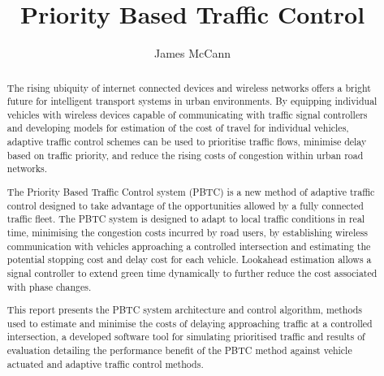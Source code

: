 \documentclass[11pt, a4paper, twoside, openright]{report}
\title{Priority Based Traffic Control}
\author{James McCann}
\date{}
\begin{document}
\frontmatter

\begin{abstract}

The rising ubiquity of internet connected devices and wireless networks offers a bright future for intelligent transport systems in urban environments. By equipping individual vehicles with wireless devices capable of communicating with traffic signal controllers and developing models for estimation of the cost of travel for individual vehicles, adaptive traffic control schemes can be used to prioritise traffic flows, minimise delay based on traffic priority, and reduce the rising costs of congestion within urban road networks.

The Priority Based Traffic Control system (PBTC) is a new method of adaptive traffic control designed to take advantage of the opportunities allowed by a fully connected traffic fleet. The PBTC system is designed to adapt to local traffic conditions in real time, minimising the congestion costs incurred by road users, by establishing wireless communication with vehicles approaching a controlled intersection and estimating the potential stopping cost and delay cost for each vehicle. Lookahead estimation allows a signal controller to extend green time dynamically to further reduce the cost associated with phase changes. 

This report presents the PBTC system architecture and control algorithm, methods used to estimate and minimise the costs of delaying approaching traffic at a controlled intersection, a developed software tool for simulating prioritised traffic and results of evaluation detailing the performance benefit of the PBTC method against vehicle actuated and adaptive traffic control methods.
  
\end{abstract}

\maketitle

\tableofcontents


\mainmatter








\backmatter

%





\end{document}
